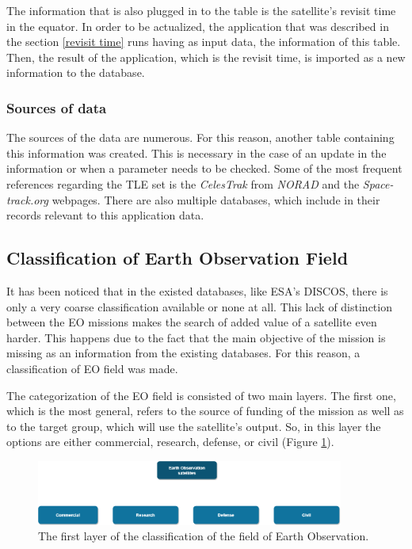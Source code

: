 The information that is also plugged in to the table is the satellite's revisit time in the equator. In order to be actualized, the application that was described in the section \ref{revisit time} runs having as input data, the information of this table. Then, the result of the application, which is the revisit time, is imported as a new information to the database.

\bigskip
\subsubsection{Sources of data}
\bigskip

The sources of the data are numerous. For this reason, another table containing this information was created. This is necessary in the case of an update in the information or when a parameter needs to be checked. Some of the most frequent references regarding the TLE set is the \textit{CelesTrak} from \textit{NORAD} and the \textit{Space-track.org} webpages. There are also multiple databases, which include in their records relevant to this application data.

\bigskip
\subsection{Classification of Earth Observation Field}
\bigskip

It has been noticed that in the existed databases, like ESA's DISCOS, there is only a very coarse classification available or none at all. This lack of distinction between the EO missions makes the search of added value of a satellite even harder. This happens due to the fact that the main objective of the mission is missing as an information from the existing databases. For this reason, a classification of EO field was made.

The categorization of the EO field is consisted of two main layers. The first one, which is the most general, refers to the source of funding of the mission as well as to the target group, which will use the satellite's output. So, in this layer the options are either commercial, research, defense, or civil (Figure \ref{classification_1st_layer}).

\begin{figure}
\centering
\includegraphics[width=0.9\textwidth]{Images/classification_1st_layer.png}\caption{The first layer of the classification of the field of Earth Observation.}
\label{classification_1st_layer}
\end{figure}

